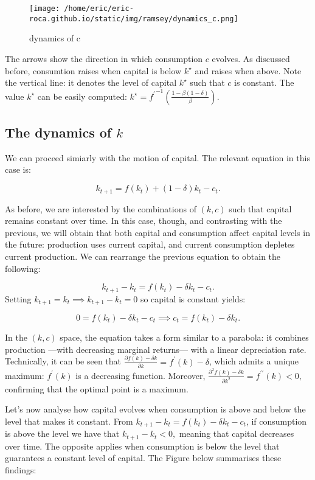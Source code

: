 \documentclass[11pt,a4paper,english]{article}
\begin{document}
\begin{figure}
\centering
\texttt{[image: /home/eric/eric-roca.github.io/static/img/ramsey/dynamics\_c.png]}
\caption{dynamics of c}
\end{figure}

The arrows show the direction in which consumption \(c\) evolves. As
discussed before, consumtion raises when capital is below \(k^{\star}\)
and raises when above. Note the vertical line: it denotes the level of
capital \(k^{\star}\) such that \(c\) is constant. The value
\(k^{\star}\) can be easily computed:
\(k^{\star} = {f^{\prime}}^{-1}\left(\frac{1-\beta (1-\delta)}{\beta}\right).\)

\hypertarget{the-dynamics-of-k}{%
\subsection{\texorpdfstring{The dynamics of
\(k\)}{The dynamics of k}}\label{the-dynamics-of-k}}

We can proceed simiarly with the motion of capital. The relevant
equation in this case is:

\[k_{t+1} = f(k_{t}) + (1- \delta)k_{t} - c_{t}.\]

As before, we are interested by the combinations of \((k,c)\) such that
capital remains constant over time. In this case, though, and
contrasting with the previous, we will obtain that both capital and
consumption affect capital levels in the future: production uses current
capital, and current consumption depletes current production. We can
rearrange the previous equation to obtain the following:

\[k_{t+1} - k_{t} = f(k_{t}) - \delta k_{t} - c_{t}.\] Setting
\(k_{t+1} = k_{t} \implies k_{t+1} - k_{t} = 0\) so capital is constant
yields:

\[ 0 = f(k_{t}) - \delta k_{t} - c_{t} \implies c_{t} = f(k_{t}) - \delta k_{t}.\]

In the \((k,c)\) space, the equation takes a form similar to a parabola:
it combines production ---with decreasing marginal returns--- with a
linear depreciation rate. Technically, it can be seen that
\(\frac{\partial f(k) - \delta k}{\partial k} = f^{\prime}(k) - \delta\),
which admits a unique maximum: \(f^{\prime}(k)\) is a decreasing
function. Moreover,
\(\frac{\partial^{2} f(k) - \delta k}{\partial k^{2}} = f^{\prime \prime}(k) < 0,\)
confirming that the optimal point is a maximum.

Let's now analyse how capital evolves when consumption is above and
below the level that makes it constant. From
\(k_{t+1} - k_{t} = f(k_{t}) - \delta k_{t} - c_{t}\), if consumption is
above the level we have that \(k_{t+1} - k_{t} < 0,\) meaning that
capital decreases over time. The opposite applies when consumption is
below the level that guarantees a constant level of capital. The Figure
below summarises these findings:
\end{document}
